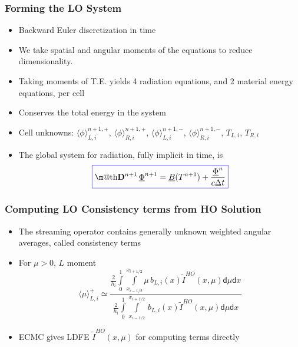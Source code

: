 \documentclass[xcolor=dvipsnames,handout,hyperref={pdfpagelabels=false}]{beamer}
\makeatletter
\newcommand*{\boxedcolor}{blue}
\renewcommand{\boxed}[1]{\textcolor{\boxedcolor}{%
  \fbox{\normalcolor\m@th$\displaystyle#1$}}}
\renewcommand{\u}[1]{\underline{#1}}
\newcommand{\colb}[1]{{\color{blue} #1}}
\newlength{\wideitemsep}
\let\olditem\item
\renewcommand{\item}{\setlength{\itemsep}{\wideitemsep}\olditem}
\newcommand{\B}[1]{\ensuremath{\mathbf{#1}}}
\renewcommand{\d}{\mathsf{d}}
\newcommand{\mom}[1]{\langle #1 \rangle}
\newcommand{\xl}{{x_{i-1/2}}}
\newcommand{\xr}{{x_{i+1/2}}}
\makeatother
\begin{document}
\begin{frame}
    \frametitle{Forming the LO System}
    \begin{itemize}
    \item Backward Euler discretization in time
    \item We take spatial and angular moments of the equations to reduce
        dimensionality.
    \item Taking moments of T.E. yields 4 radiation equations, and 2 material energy
        equations, per cell

    \item Conserves the total energy in the system

    \item Cell unknowns: $\mom{\phi}_{L,i}^{n+1,+}$, $\mom{\phi}_{R,i}^{n+1,+}$,
        $\mom{\phi}_{L,i}^{n+1,-}$, $\mom{\phi}_{R,i}^{n+1,-}$, $T_{L,i}$, $T_{R,i}$

    \item The global system for radiation, {\color{blue}fully implicit} in time, is
        \begin{equation*}
            \boxed{ \B  D^{n+1}\, \underline \Phi^{n+1} = \u B(T^{n+1}) + \frac{ \underline
            \Phi^n}{c\Delta t}}
        \end{equation*}
    \end{itemize}
\end{frame}


\begin{frame}
    \frametitle{Computing LO Consistency terms from HO Solution}
    \begin{itemize}
        \item The streaming operator contains generally unknown weighted angular averages,
            called \colb{consistency terms}
        \item For $\mu>0$, $L$ moment
    \begin{equation}
\mom{{\mu}}_{L,i}^{+} \simeq \frac{\displaystyle 
\frac{2}{h_i} \int\limits_0^1 \int\limits_\xl^\xr \mu \, b_{L,i}(x) \tilde I^{HO}(x,\mu) \d \mu \d x } 
{\displaystyle \frac{2}{h_i} \int\limits_0^1 \int\limits_\xl^\xr \, b_{L,i}(x)
\tilde I^{HO}(x,\mu) \d \mu \d x } 
    \end{equation}
        \item ECMC gives LDFE $\tilde  I^{HO}(x,\mu)$ for computing terms directly
    \end{itemize}
\end{frame}
\end{document}
